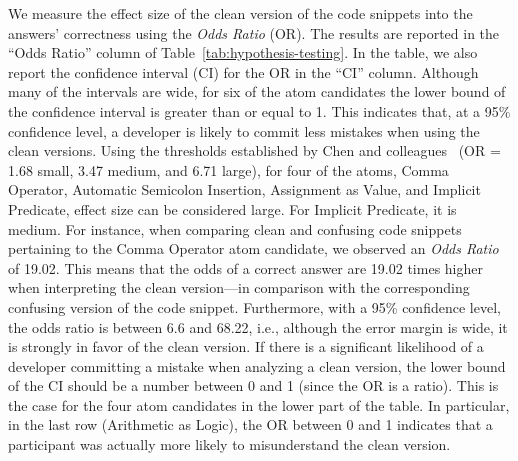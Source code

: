We measure the effect size of the clean version of the code snippets into the answers' correctness using the \emph{Odds Ratio} (OR). The results are reported in the ``Odds Ratio'' column of Table~\ref{tab:hypothesis-testing}. In the table, we also report the confidence interval (CI) for the OR in the ``CI'' column. Although many of the intervals are wide, for six of the atom candidates the lower bound of the confidence interval is greater than or equal to 1. This indicates that, at a 95\% confidence level, a developer is likely to commit less mistakes when using the clean versions. 
Using the thresholds established by Chen and colleagues~\cite{Chen:2010:HBB} (OR = 1.68 small, 3.47 medium, and 6.71 large), for four of the atoms, Comma Operator, Automatic Semicolon Insertion, Assignment as Value, and Implicit Predicate, effect size can be considered large. For Implicit Predicate, it is medium. 
For instance, when comparing clean and confusing code snippets pertaining to the Comma Operator atom candidate, we observed an \emph{Odds Ratio} of \num{19.02}. This means that the odds of a correct answer are \num{19.02} times higher when interpreting the clean version---in comparison with the corresponding confusing version of the code snippet. Furthermore, with a 95\% confidence level, the odds  ratio is between 6.6 and 68.22, i.e., although the error margin is wide, it is strongly in favor of the clean version. If there is a significant likelihood of a developer committing a mistake when analyzing a clean version, the lower bound of the CI should be a number between 0 and 1 (since the OR is a ratio). This is the case for the four atom candidates in the lower part of the table. In particular, in the last row (Arithmetic as Logic), the OR between 0 and 1 indicates that a participant was actually more likely to misunderstand the clean version. 

